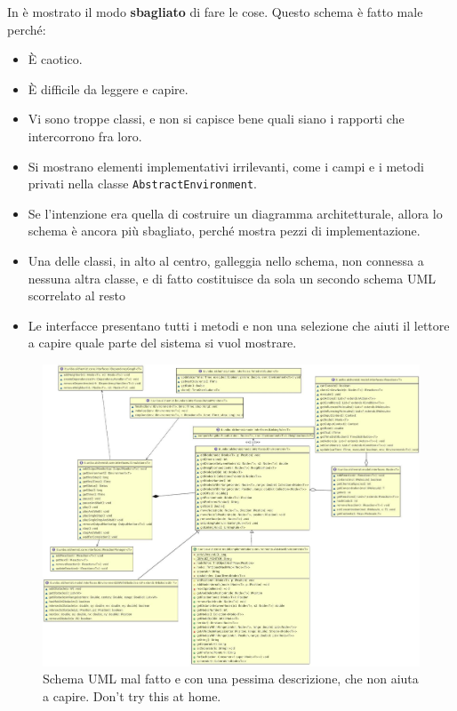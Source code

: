 \documentclass[a4paper,12pt]{report}
\begin{document}
In  è mostrato il modo \textbf{sbagliato} di fare le cose.
%
Questo schema è fatto male perché:
\begin{itemize}
	\item È caotico.
	\item È difficile da leggere e capire.
	\item Vi sono troppe classi, e non si capisce bene quali siano i rapporti che intercorrono fra loro.
	\item Si mostrano elementi implementativi irrilevanti, come i campi e i metodi privati nella classe \texttt{AbstractEnvironment}.
	\item Se l'intenzione era quella di costruire un diagramma architetturale, allora lo schema è ancora più sbagliato, perché mostra pezzi di implementazione.
	\item Una delle classi, in alto al centro, galleggia nello schema, non connessa a nessuna altra classe, e di fatto costituisce da sola un secondo schema UML scorrelato al resto
	\item Le interfacce presentano tutti i metodi e non una selezione che aiuti il lettore a capire quale parte del sistema si vuol mostrare.
\end{itemize}


\begin{figure}
\centering{}
\includegraphics[width=\textwidth]{img/badarch}
\caption{Schema UML mal fatto e con una pessima descrizione, che non aiuta a capire. Don't try this at home.}
\label{img:badarch}
\end{figure}
\end{document}
